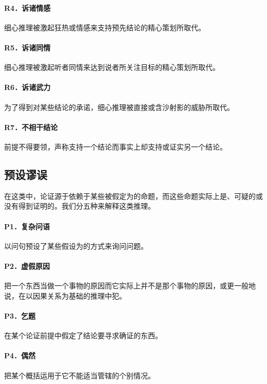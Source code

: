 \paragraph{R4．诉诸情感}
细心推理被激起狂热或情感来支持预先结论的精心策划所取代。

\paragraph{R5．诉诸同情}
细心推理被激起听者同情来达到说者所关注目标的精心策划所取代。

\paragraph{R6．诉诸武力}
为了得到对某些结论的承诺，细心推理被直接或含沙射影的威胁所取代。

\paragraph{R7．不相干结论}
前提不得要领，声称支持一个结论而事实上却支持或证实另一个结论。

\subsection*{预设谬误}
在这类中，论证源于依赖于某些被假定为的命题，而这些命题实际上是、可疑的或没有得到证明的。我们分五种来解释这类推理。

\paragraph{P1．复杂问语}
以问句预设了某些假设为的方式来询问问题。

\paragraph{P2．虚假原因}
把一个东西当做一个事物的原因而它实际上并不是那个事物的原因，或更一般地说，在以因果关系为基础的推理中犯。

\paragraph{P3．乞题}
在某个论证前提中假定了结论要寻求确证的东西。

\paragraph{P4．偶然}
把某个概括运用于它不能适当管辖的个别情况。

